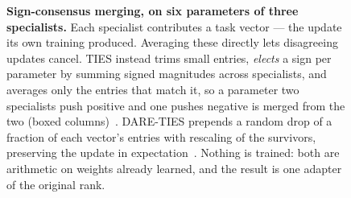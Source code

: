 \begin{figure}[t]
\caption{\textbf{Sign-consensus merging, on six parameters of three specialists.}
Each specialist contributes a task vector --- the update its own training produced. Averaging these
directly lets disagreeing updates cancel. TIES instead trims small entries, \emph{elects} a sign per
parameter by summing signed magnitudes across specialists, and averages only the entries that match
it, so a parameter two specialists push positive and one pushes negative is merged from the two
(boxed columns)~\cite{ties}. DARE-TIES prepends a random drop of a fraction of each vector's entries
with rescaling of the survivors, preserving the update in expectation~\cite{dare}. Nothing is
trained: both are arithmetic on weights already learned, and the result is one adapter of the
original rank.}
\label{fig:merging}
\end{figure}
